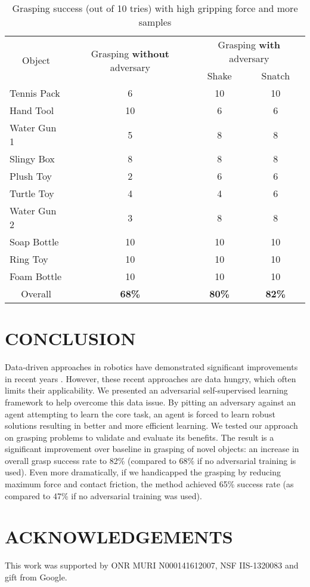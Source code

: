 \documentclass[letterpaper, 10 pt, conference]{ieeeconf}  %
\begin{document}
\begin{table}[]
\centering
\caption{Grasping success (out of 10 tries) with high gripping force and more samples}
\label{tab:results_high}
\begin{tabular}{l|c|c|c|}
\multicolumn{1}{c|}{\multirow{2}{*}{Object}} & \multicolumn{1}{c|}{\multirow{2}{*}{Grasping \textbf{without} adversary}} & \multicolumn{2}{c|}{Grasping \textbf{with} adversary} \\ \cline{3-4} 
\multicolumn{1}{c|}{} & \multicolumn{1}{c|}{} & \multicolumn{1}{c|}{Shake} & \multicolumn{1}{c|}{Snatch} \\ \hline  
Tennis Pack  & 6 & 10 & 10 \\
Hand Tool  &10 & 6 & 6 \\
Water Gun 1  & 5 & 8 & 8 \\
Slingy Box &  8 & 8 & 8 \\
Plush Toy &  2 & 6 & 6 \\
Turtle Toy &  4 & 4 & 6 \\
Water Gun 2 & 3 & 8 & 8 \\
Soap Bottle &  10 & 10 & 10 \\
Ring Toy & 10 & 10 & 10 \\
Foam Bottle &  10 & 10 & 10 \\ \hline
\multicolumn{1}{c|}{Overall} & \textbf{68\%} & \textbf{80\%} & \textbf{82\%}
\end{tabular}
\end{table}
\section{CONCLUSION}
Data-driven approaches in robotics have demonstrated significant improvements in recent years  \cite{lenz2015deep, pinto2016supersizing, pinto2016curious, levine2016end, levine2016learning}.  However, these recent approaches are data hungry, which often limits their applicability. We presented an adversarial self-supervised learning framework to help overcome this data issue. By pitting an adversary against an agent attempting to learn the core task, an agent is forced to learn robust solutions resulting in better and more efficient learning. We tested our approach on grasping problems to validate and evaluate its benefits.  The result is a significant improvement over baseline in grasping of novel objects: an increase in overall grasp success rate to 82\% (compared to 68\% if no adversarial training is used).  Even more dramatically, if we handicapped the grasping by reducing maximum force and contact friction, the method achieved 65\% success rate (as compared to 47\% if no adversarial training was used).

\section*{ACKNOWLEDGEMENTS}
This work was supported by ONR MURI N000141612007, NSF IIS-1320083 and gift from Google.



\end{document}
